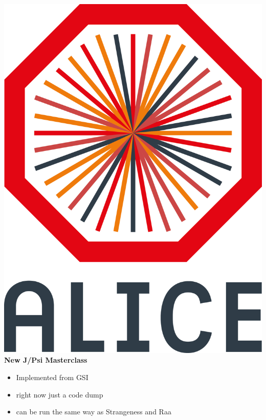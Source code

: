 \documentclass[aspectratio=1610,14pt,dvipsnames]{beamer}
\begin{document}
\begin{frame}{\includegraphics[height=0.07\textheight]{2012-Jul-04-4_Color_Logo_CB.png} \hspace{0.2cm}\textbf{New J/Psi Masterclass}}
  \begin{itemize}
    \item Implemented from GSI
    \item right now just a code dump
    \item can be run the same way as Strangeness and Raa
  \end{itemize}
\end{frame}
\end{document}

